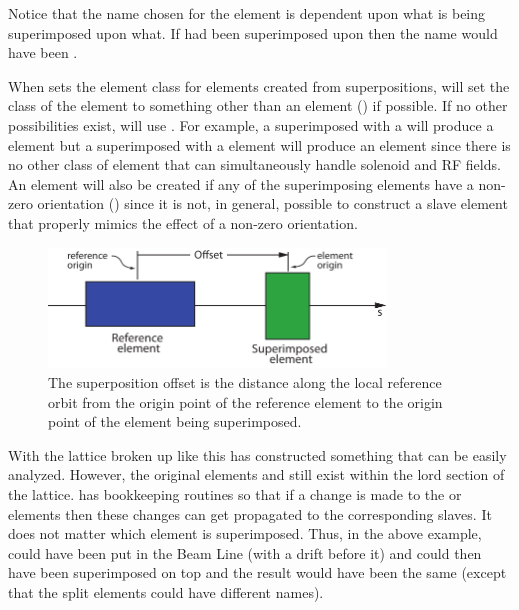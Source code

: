 Notice that the name chosen for the  element  is dependent upon what is
being superimposed upon what. If  had been superimposed upon  then the name would have
been .

When \bmad sets the element class for elements created from superpositions, \bmad will set the class
of the element to something other than an  element () if possible. If
no other possibilities exist, \bmad will use . For example, a 
superimposed with a  will produce a   element but a
 superimposed with a  element will produce an  element since
there is no other class of element that can simultaneously handle solenoid and RF fields. An
  element will also be created if any of the superimposing elements 
have a non-zero orientation () since it is not, in general, possible to construct a slave
element that properly mimics the effect of a non-zero orientation.

  \begin{figure}[tb]
  \centering 
  \includegraphics[width=0.8\textwidth]{superimpose.pdf} 
  \caption[Superposition Offset.]{
The superposition offset is the distance along the local reference orbit from the origin point of the
reference element to the origin point of the element being superimposed.
  }
  \label{f:superimpose}
  \end{figure}

With the lattice broken up like this \bmad has constructed something that can be easily
analyzed. However, the original elements  and  still exist within the lord section of
the lattice. \bmad has bookkeeping routines so that if a change is made to the  or 
elements then these changes can get propagated to the corresponding slaves. It does not matter which
element is superimposed. Thus, in the above example,  could have been put in the Beam Line
(with a drift before it) and  could then have been superimposed on top and the result would
have been the same (except that the split elements could have different names).

